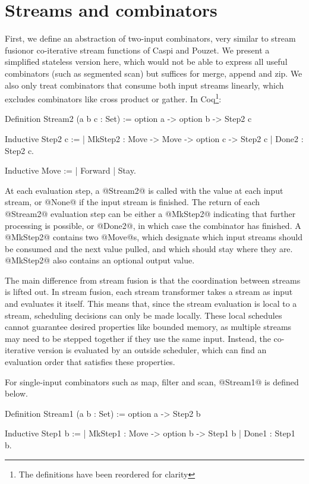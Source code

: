 \section{Streams and combinators}
\label{s:Streams}
First, we define an abstraction of two-input combinators, very similar to stream fusion\CITE or co-iterative stream functions of Caspi and Pouzet\cite{caspi1998co}.
We present a simplified stateless version here, which would not be able to express all useful combinators (such as segmented scan) but suffices for merge, append and zip.
We also only treat combinators that consume both input streams linearly, which excludes combinators like cross product or gather.
In Coq\footnote{The definitions have been reordered for clarity}:

\begin{code}
Definition Stream2 (a b c : Set)
 := option a -> option b -> Step2 c

Inductive Step2 c :=
 | MkStep2 : Move -> Move -> option c -> Step2 c
 | Done2   : Step2 c.

Inductive Move :=
 | Forward
 | Stay.
\end{code}

At each evaluation step, a @Stream2@ is called with the value at each input stream, or @None@ if the input stream is finished.
The return of each @Stream2@ evaluation step can be either a @MkStep2@ indicating that further processing is possible, or @Done2@, in which case the combinator has finished.
A @MkStep2@ contains two @Move@s, which designate which input streams should be consumed and the next value pulled, and which should stay where they are.
@MkStep2@ also contains an optional output value.

The main difference from stream fusion is that the coordination between streams is lifted out.
In stream fusion, each stream transformer takes a stream as input and evaluates it itself.
This means that, since the stream evaluation is local to a stream, scheduling decisions can only be made locally.
These local schedules cannot guarantee desired properties like bounded memory, as multiple streams may need to be stepped together if they use the same input.
Instead, the co-iterative version is evaluated by an outside scheduler, which can find an evaluation order that satisfies these properties.

For single-input combinators such as map, filter and scan, @Stream1@ is defined below.
\begin{code}
Definition Stream1 (a b : Set)
 := option a -> Step2 b

Inductive Step1 b :=
 | MkStep1 : Move -> option b -> Step1 b
 | Done1   : Step1 b.
\end{code}


